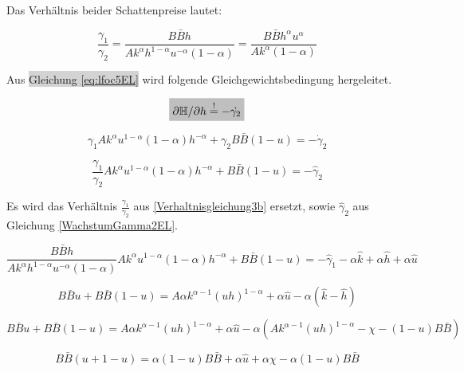 Das Verhältnis beider Schattenpreise lautet:


	\begin{equation}
		\frac{\gamma_{1}}{\gamma_{2}}= \frac{B \bar{B} h}{A k^{\alpha} h^{1- \alpha} u^{- \alpha} (1- \alpha)} = \frac{B \bar{B} h^{\alpha} u^{\alpha}} {A k^{\alpha} (1- \alpha)}
		\label{Verhaltnisgleichung3bn}
	\end{equation}


Aus \colorbox{lightgray}{Gleichung \eqref{eq:lfoc5EL}} wird folgende Gleichgewichtsbedingung hergeleitet.


	\begin{equation}
		\colorbox{lightgray}{$\partial\mathbb{H}/\partial h\overset{!}{=}-\dot{\gamma_2}$}
	\end{equation}


	\begin{equation}
		\gamma_{1} A k^{\alpha} u^{1- \alpha} (1- \alpha) h^{- \alpha} + \gamma_{2} B \bar{B} (1- u) = - \dot{\gamma}_{2}
	\end{equation}


	\begin{equation}
		\frac{\gamma_{1}}{\gamma_{2}} A k^{\alpha} u^{1- \alpha} (1- \alpha) h^{- \alpha} + B \bar{B} (1- u) = - \hat{\gamma}_{2}
	\end{equation}


Es wird das Verhältnis $\frac{\gamma_1}{\gamma_2}$ aus \eqref{Verhaltnisgleichung3b} ersetzt, sowie $\hat{\gamma}_2$ aus Gleichung \eqref{WachstumGamma2EL}.


	\begin{equation*}
		\frac{B \bar{B} h}{A k^{\alpha} h^{1 - \alpha}u^{- \alpha} (1- \alpha) } A k^{\alpha} u^{1- \alpha} (1- \alpha) h^{- \alpha} + B \bar{B} (1- u) = - \hat{\gamma}_{1} - \alpha \hat{k} + \alpha \hat{h} + \alpha \hat{u}
	\end{equation*}


	\begin{equation}
		B \bar{B} u + B \bar{B} (1- u) = A \alpha k^{\alpha -1} (uh)^{1- \alpha} + \alpha \hat{u} - \alpha (\hat{k} - \hat{h}) 
	\end{equation}


	\begin{equation}
		B \bar{B} u + B \bar{B} (1- u) = A \alpha k^{\alpha -1} (uh)^{1- \alpha} + \alpha \hat{u} - \alpha (Ak^{\alpha -1} (uh)^{1-\alpha} - \chi - (1-u) B \bar{B}) 
	\end{equation}


	\begin{equation}
		B \bar{B} (u +1 - u)= \alpha (1-u)B \bar{B} + \alpha \hat{u}+ \alpha \chi -\alpha (1-u)B \bar{B}
	\end{equation}


